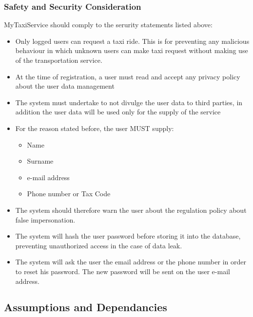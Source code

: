 \documentclass[11pt, a4paper,titlepage]{article}
\newcommand{\productname}{MyTaxiService }
\begin{document}
\subsubsection{Safety and Security Consideration}
\productname should comply to the serurity statements listed above: \newline
\begin{itemize}
	\item Only logged users can request a taxi ride. This is for preventing any malicious behaviour in which unknown users can make taxi request without making use of the transportation service.
	\item At the time of registration, a user must read and accept any privacy policy about the user data management
	\item The system must undertake to not divulge the user data to third parties, in addition the user data will be used only for the supply of the service
	\item For the reason stated before, the user MUST supply:
		\begin{itemize}
			\item Name
			\item Surname
			\item e-mail address
			\item Phone number or Tax Code
		\end{itemize}
	\item The system should therefore warn the user about the regulation policy about false impersonation.
	\item The system will hash the user password before storing it into the database, preventing unauthorized access in the case of data leak.
	\item The system will ask the user the email address or the phone number in order to reset his password. The new password will be sent on the user e-mail address.
\end{itemize}
\subsection{Assumptions and Dependancies}
\end{document}

